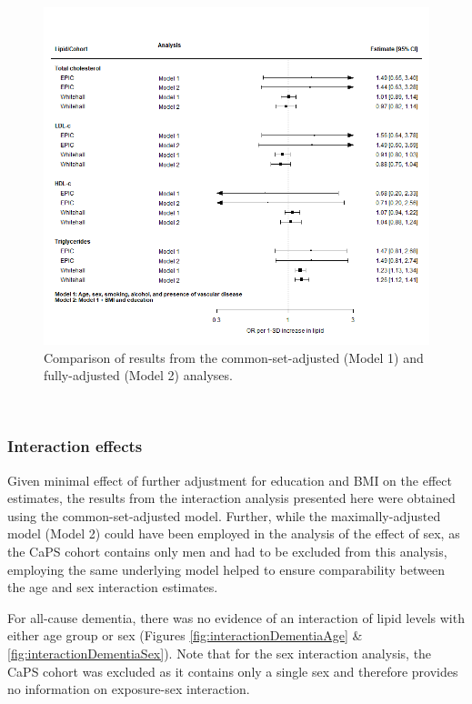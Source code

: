 \documentclass[a4paper, twoside]{templates/ociamthesis}
\begin{document}
\begin{figure}[H]
\includegraphics[width=1\linewidth]{figures/ipd/main_model_comparison} \caption[Comparison of partially and maximally adjusted results]{Comparison of results from the common-set-adjusted (Model 1) and fully-adjusted (Model 2) analyses.}\label{fig:ipdModelComparison}
\end{figure}

~

\hypertarget{interaction-effects}{%
\subsubsection{Interaction effects}\label{interaction-effects}}

Given minimal effect of further adjustment for education and BMI on the effect estimates, the results from the interaction analysis presented here were obtained using the common-set-adjusted model. Further, while the maximally-adjusted model (Model 2) could have been employed in the analysis of the effect of sex, as the CaPS cohort contains only men and had to be excluded from this analysis, employing the same underlying model helped to ensure comparability between the age and sex interaction estimates.

For all-cause dementia, there was no evidence of an interaction of lipid levels with either age group or sex (Figures \ref{fig:interactionDementiaAge} \& \ref{fig:interactionDementiaSex}). Note that for the sex interaction analysis, the CaPS cohort was excluded as it contains only a single sex and therefore provides no information on exposure-sex interaction.
\end{document}

